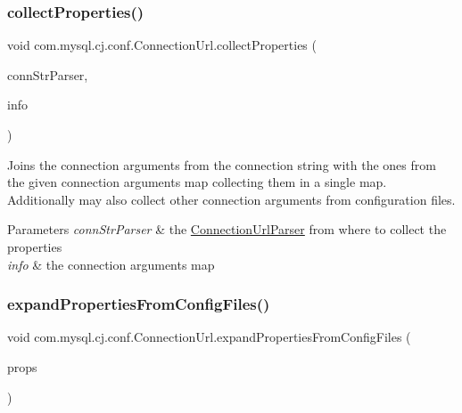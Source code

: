\subsubsection{\texorpdfstring{collect\+Properties()}{collectProperties()}}
{\footnotesize\ttfamily void com.\+mysql.\+cj.\+conf.\+Connection\+Url.\+collect\+Properties (\begin{DoxyParamCaption}\item[{\mbox{\hyperlink{classcom_1_1mysql_1_1cj_1_1conf_1_1_connection_url_parser}{Connection\+Url\+Parser}}}]{conn\+Str\+Parser,  }\item[{Properties}]{info }\end{DoxyParamCaption})\hspace{0.3cm}{\ttfamily [protected]}}

Joins the connection arguments from the connection string with the ones from the given connection arguments map collecting them in a single map. Additionally may also collect other connection arguments from configuration files.


\begin{DoxyParams}{Parameters}
{\em conn\+Str\+Parser} & the \mbox{\hyperlink{classcom_1_1mysql_1_1cj_1_1conf_1_1_connection_url_parser}{Connection\+Url\+Parser}} from where to collect the properties \\
\hline
{\em info} & the connection arguments map \\
\hline
\end{DoxyParams}
\mbox{\label{classcom_1_1mysql_1_1cj_1_1conf_1_1_connection_url_a1029263b45f093075865f542e2d0fe87}} 
\subsubsection{\texorpdfstring{expand\+Properties\+From\+Config\+Files()}{expandPropertiesFromConfigFiles()}}
{\footnotesize\ttfamily void com.\+mysql.\+cj.\+conf.\+Connection\+Url.\+expand\+Properties\+From\+Config\+Files (\begin{DoxyParamCaption}\item[{Map$<$ String, String $>$}]{props }\end{DoxyParamCaption})\hspace{0.3cm}{\ttfamily [protected]}}

